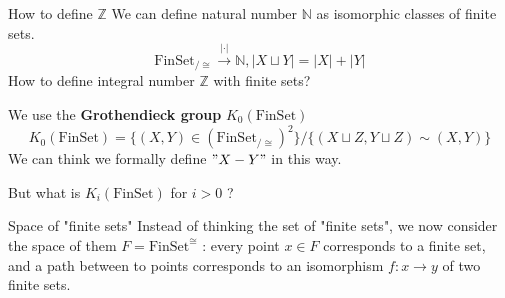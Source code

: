 \documentclass[12pt]{beamer}
\begin{document}
\begin{frame}{How to define $\mathbb{Z}$}
We can define natural number $\mathbb{N}$ as isomorphic classes of finite sets.
\[
  \mathrm{FinSet}_{/\cong} \xrightarrow{|\cdot|} \mathbb{N}, |X \sqcup Y| = |X|+|Y| 
\]
How to define integral number $\mathbb{Z}$ with finite sets? 

\pause
We use the \textbf{Grothendieck group} $K_0(\mathrm{FinSet})$
\[
  K_0(\mathrm{FinSet}) = \{ (X,Y)\in (\mathrm{FinSet}_{/\cong})^2   \} / \{ (X \sqcup Z , Y \sqcup Z) \sim (X,Y)\}
\]
We can think we formally define $"X-Y"$ in this way.

\pause
But what is $K_i(\mathrm{FinSet})$ for $i>0$ ?
\end{frame}
\begin{frame}{Space of "finite sets"}
  Instead of thinking the set of "finite sets", we now consider the space of them $F = \mathrm{FinSet}^{\cong}$ : every point $x\in F$ corresponds to a finite set, and a path between to points corresponds to an isomorphism $f:x\to y$ of two finite sets. 
  \pause

\begin{center}


\begin{tikzpicture}[x=0.75pt,y=0.75pt,yscale=-1,xscale=1]


\end{tikzpicture}
\end{center}
\end{frame}
\end{document}
